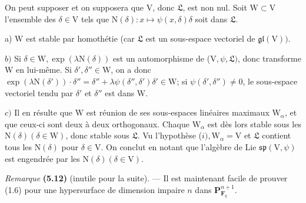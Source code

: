 \documentclass[10pt,leqno]{article}
\begin{document}
\par

\par

\noindent On peut supposer et on supposera que \(\mathrm{V}\), donc \(\mathfrak{L} \), est non nul. Soit \(\mathrm{W}\subset \mathrm{V}\) l’ensemble des \(\delta \in \mathrm{V}\) tels que \(\mathrm{N}(\delta ):x\longmapsto \psi (x,\delta )\delta \) soit dans \(\mathfrak{L} \).\par

\noindent a) \(\mathrm{W}\) est stable par homothétie (car \(\mathfrak{L} \) est un sous-espace vectoriel de \(\mathfrak{gl}(\mathrm{V}))\).\par

\noindent \(b)\) Si \(\delta \in \mathrm{W}, \operatorname{exp}(\lambda \mathrm{N}(\delta ))\) est un automorphisme de (\(\mathrm{V},\psi ,\mathfrak{L} )\), donc transforme \(\mathrm{W}\) en lui-même. Si \(\delta ',\delta ''\in \mathrm{W}\), on a donc \(\operatorname{exp}(\lambda \mathrm{N}(\delta '))\cdot \delta ''=\delta ''+\lambda \psi (\delta '',\delta ')\delta '\in \mathrm{W}\); si \(\psi (\delta ',\delta '')\ne 0\), le sous-espace vectoriel tendu par \(\delta '\) et \(\delta ''\) est dans \(\mathrm{W}\).\par

\clearpage

\label{physical-23}\par\smallskip

\noindent \(c)\) Il en résulte que \(\mathrm{W}\) est réunion de ses sous-espaces linéaires maximaux \(\mathrm{W}_{\alpha }\), et que ceux-ci sont deux à deux orthogonaux. Chaque \(\mathrm{W}_{\alpha }\) est dès lors stable sous les \(\mathrm{N}(\delta ) (\delta \in \mathrm{W})\), donc stable sous \(\mathfrak{L} \). Vu l’hypothèse (\(i), \mathrm{W}_{\alpha }=\mathrm{V}\) et \(\mathfrak{L} \) contient tous les \(\mathrm{N}(\delta )\) pour \(\delta \in \mathrm{V}\). On conclut en notant que l’algèbre de Lie \(\mathfrak{sp}(\mathrm{V},\psi )\) est engendrée par les \(\mathrm{N}(\delta ) (\delta \in \mathrm{V})\).\par

\noindent \emph{Remarque} \textbf{(5.12)} (inutile pour la suite). — Il est maintenant facile de prouver (1.6) pour une hypersurface de dimension impaire \(n\) dans \(\mathbf{P}^{n+1}_{\mathbf{F}_{q}}\).\par
\end{document}
